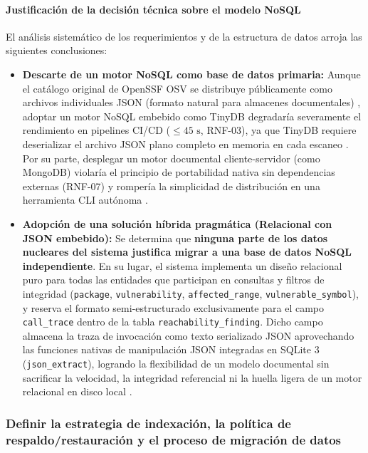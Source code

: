 \paragraph*{Justificación de la decisión técnica sobre el modelo NoSQL}
El análisis sistemático de los requerimientos y de la estructura de datos arroja las siguientes conclusiones:

\begin{itemize}
    \item \textbf{Descarte de un motor NoSQL como base de datos primaria:} 
    Aunque el catálogo original de OpenSSF OSV se distribuye públicamente como archivos individuales JSON (formato natural para almacenes documentales) \cite{openssf2023osv}, adoptar un motor NoSQL embebido como TinyDB degradaría severamente el rendimiento en pipelines CI/CD ($\le 45\text{ s}$, RNF-03), ya que TinyDB requiere deserializar el archivo JSON plano completo en memoria en cada escaneo \cite{torres2026proyecto}. Por su parte, desplegar un motor documental cliente-servidor (como MongoDB) violaría el principio de portabilidad nativa sin dependencias externas (RNF-07) y rompería la simplicidad de distribución en una herramienta CLI autónoma \cite{pressman2020software}.

    \item \textbf{Adopción de una solución híbrida pragmática (Relacional con JSON embebido):} 
    Se determina que \textbf{ninguna parte de los datos nucleares del sistema justifica migrar a una base de datos NoSQL independiente}. En su lugar, el sistema implementa un diseño relacional puro para todas las entidades que participan en consultas y filtros de integridad (\texttt{package}, \texttt{vulnerability}, \texttt{affected\_\allowbreak range}, \texttt{vulnerable\_\allowbreak symbol}), y reserva el formato semi-estructurado exclusivamente para el campo \texttt{call\_\allowbreak trace} dentro de la tabla \texttt{reachability\_\allowbreak finding}. Dicho campo almacena la traza de invocación como texto serializado JSON aprovechando las funciones nativas de manipulación JSON integradas en SQLite 3 (\texttt{json\_\allowbreak extract}), logrando la flexibilidad de un modelo documental sin sacrificar la velocidad, la integridad referencial ni la huella ligera de un motor relacional en disco local \cite{martin2017cleanarch, openssf2023osv}.
\end{itemize}

\subsubsection{Definir la estrategia de indexación, la política de respaldo/restauración y el proceso de migración de datos}

